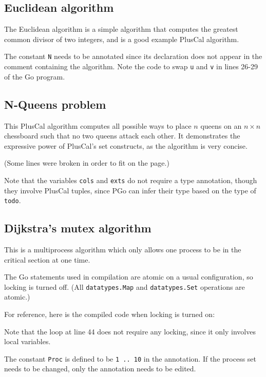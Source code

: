 \subsection{Euclidean algorithm}
The Euclidean algorithm is a simple algorithm that computes the greatest common divisor of two integers, and is a good example PlusCal algorithm.





The constant \texttt{N} needs to be annotated since its declaration does not appear in the comment containing the algorithm. Note the code to swap \texttt{u} and \texttt{v} in lines 26-29 of the Go program.

\subsection{N-Queens problem}
This PlusCal algorithm computes all possible ways to place $n$ queens on an $n \times n$ chessboard such that no two queens attack each other. It demonstrates the expressive power of PlusCal's set constructs, as the algorithm is very concise.





(Some lines were broken in order to fit on the page.)

Note that the variables \texttt{cols} and \texttt{exts} do not require a type annotation, though they involve PlusCal tuples, since PGo can infer their type based on the type of \texttt{todo}.

\subsection{Dijkstra's mutex algorithm}
This is a multiprocess algorithm which only allows one process to be in the critical section at one time.





The Go statements used in compilation are atomic on a usual configuration, so locking is turned off. (All \texttt{datatypes.Map} and \texttt{datatypes.Set} operations are atomic.)

For reference, here is the compiled code when locking is turned on:



Note that the loop at line 44 does not require any locking, since it only involves local variables.

The constant \texttt{Proc} is defined to be \texttt{1 .. 10} in the annotation. If the process set needs to be changed, only the annotation needs to be edited.
